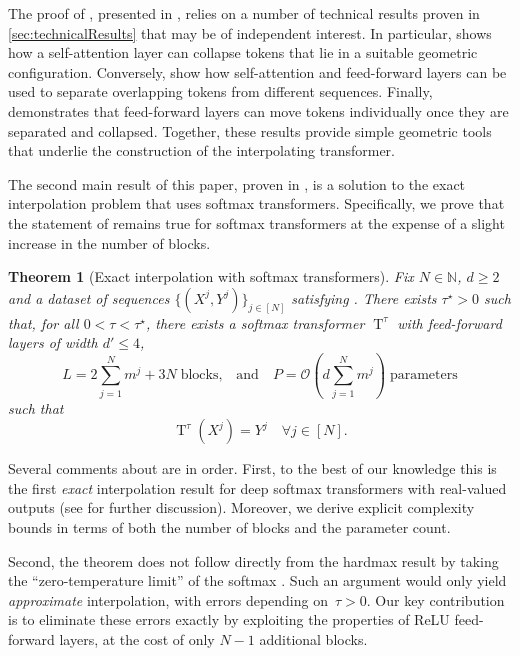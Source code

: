 \documentclass[pdflatex,sn-mathphys-num]{sn-jnl}%
\theoremstyle{thmstyleone}%
\newtheorem{theorem}{Theorem}[section]%
\theoremstyle{thmstyletwo}%
\theoremstyle{thmstylethree}%
\numberwithin{equation}{section}
\newcommand{\N}{\mathbb{N}}
\DeclareMathOperator{\T}{\mathrm{T}}
\begin{document}
The proof of , presented in , relies on a number of technical results proven in \cref{sec:technicalResults} that may be of independent interest. In particular,  shows how a self-attention layer can collapse tokens that lie in a suitable geometric configuration. Conversely,  show how self-attention and feed-forward layers can be used to separate overlapping tokens from different sequences. Finally,  demonstrates that feed-forward layers can move tokens individually once they are separated and collapsed. Together, these results provide simple geometric tools that underlie the construction of the interpolating transformer.

The second main result of this paper, proven in , is a solution to the exact interpolation problem that uses softmax transformers. Specifically, we prove that the statement of  remains true for softmax transformers at the expense of a slight increase in the number of blocks.

\begin{theorem}[Exact interpolation with softmax transformers]
\label{thm:mainResultSoftmax}
    Fix $N\in \N$, $d\geq 2$ and a dataset of sequences $\{(X^j, Y^j)\}_{j\in [N]}$ satisfying .
    There exists $\tau^\star > 0$ such that, for all $0 < \tau < \tau^\star$, there exists a softmax transformer $\T^{\tau}$ 
    with feed-forward layers of width $d' \leq 4$, 
    \begin{equation}\label{eq:mainthmSoftmax}
        L = 2\sum_{j=1}^N m^j + 3N \; \text{blocks,} \quad \text{and} \quad 
        P = \mathcal{O}\left(d \sum_{j=1}^N m^j\right)\; \text{parameters}
    \end{equation}
    such that 
    $$
    \T^\tau (X^j) = Y^j \quad \forall j \in [N].
    $$ 
\end{theorem}

Several comments about  are in order. 
First, to the best of our knowledge this is the first \emph{exact} interpolation result for deep softmax transformers with real-valued outputs (see  for further discussion). Moreover, we derive explicit complexity bounds in terms of both the number of blocks and the parameter count. 

Second, the theorem does not follow directly from the hardmax result by taking the ``zero-temperature limit'' of the softmax \cite{elfadelSoftmax1993}. Such an argument would only yield \emph{approximate} interpolation, with errors depending on~$\tau>0$. Our key contribution is to eliminate these errors exactly by exploiting the properties of ReLU feed-forward layers, at the cost of only $N-1$ additional blocks. 
\end{document}
